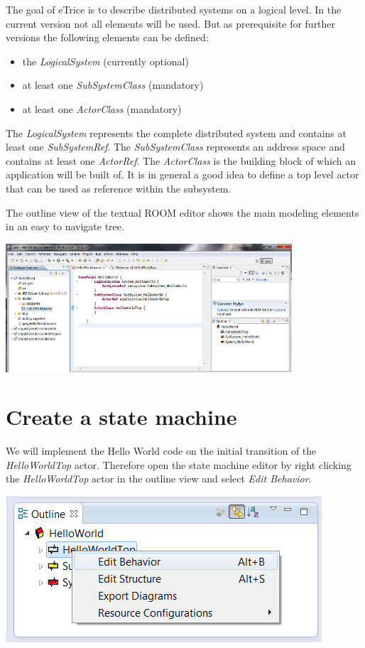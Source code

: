 The goal of eTrice is to describe distributed systems on a logical level. In the current version not all 
elements will be used. But as prerequisite for further versions the following elements can be defined:
\begin{itemize}
\item the \textit{LogicalSystem} (currently optional)
\item at least one \textit{SubSystemClass} (mandatory)
\item at least one \textit{ActorClass} (mandatory)
\end{itemize}

The \textit{LogicalSystem} represents the complete distributed system and contains at least one 
\textit{SubSystemRef}. The \textit{SubSystemClass} represents an address space and contains at least one 
\textit{ActorRef}. The \textit{ActorClass} is the building block of which an application will be built of. 
It is in general a good idea to define a top level actor that can be used as reference within the subsystem.

The outline view of the textual ROOM editor shows the main modeling elements in an easy to navigate tree.

\includegraphics[width=0.8\textwidth]{images/015-HelloWorld02.png}


\section{Create a state machine}

We will implement the Hello World code on the initial transition of the \textit{HelloWorldTop} actor. 
Therefore open the state machine editor by right clicking the \textit{HelloWorldTop} actor in the outline 
view and select \textit{Edit Behavior}.

\includegraphics{images/015-HelloWorld03.png}

